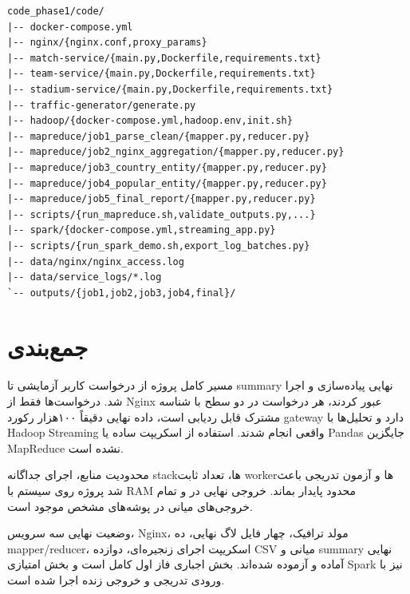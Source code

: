 \documentclass[12pt,a4paper]{article}
\begin{document}
\begin{latin}
\begin{lstlisting}
code_phase1/code/
|-- docker-compose.yml
|-- nginx/{nginx.conf,proxy_params}
|-- match-service/{main.py,Dockerfile,requirements.txt}
|-- team-service/{main.py,Dockerfile,requirements.txt}
|-- stadium-service/{main.py,Dockerfile,requirements.txt}
|-- traffic-generator/generate.py
|-- hadoop/{docker-compose.yml,hadoop.env,init.sh}
|-- mapreduce/job1_parse_clean/{mapper.py,reducer.py}
|-- mapreduce/job2_nginx_aggregation/{mapper.py,reducer.py}
|-- mapreduce/job3_country_entity/{mapper.py,reducer.py}
|-- mapreduce/job4_popular_entity/{mapper.py,reducer.py}
|-- mapreduce/job5_final_report/{mapper.py,reducer.py}
|-- scripts/{run_mapreduce.sh,validate_outputs.py,...}
|-- spark/{docker-compose.yml,streaming_app.py}
|-- scripts/{run_spark_demo.sh,export_log_batches.py}
|-- data/nginx/nginx_access.log
|-- data/service_logs/*.log
`-- outputs/{job1,job2,job3,job4,final}/
\end{lstlisting}
\end{latin}

\section{جمع‌بندی}

مسیر کامل پروژه از درخواست کاربر آزمایشی تا summary نهایی پیاده‌سازی و اجرا شد. درخواست‌ها فقط از Nginx عبور کردند، هر درخواست در دو سطح با شناسه مشترک قابل ردیابی است، داده نهایی دقیقاً ۱۰۰هزار رکورد gateway دارد و تحلیل‌ها با Hadoop Streaming واقعی انجام شدند. استفاده از اسکریپت ساده یا Pandas جایگزین MapReduce نشده است.

محدودیت منابع، اجرای جداگانه stackها، تعداد ثابت workerها و آزمون تدریجی باعث شد پروژه روی سیستم با RAM محدود پایدار بماند. خروجی نهایی در  و تمام خروجی‌های میانی در پوشه‌های مشخص موجود است.

\begin{scorebox}{وضعیت نهایی}
سه سرویس، Nginx، مولد ترافیک، چهار فایل لاگ نهایی، ده mapper/reducer، اسکریپت اجرای زنجیره‌ای، دوازده CSV میانی و summary نهایی آماده و آزموده شده‌اند. بخش اجباری فاز اول کامل است و بخش امتیازی Spark نیز با ورودی تدریجی و خروجی زنده اجرا شده است.
\end{scorebox}
\end{document}

